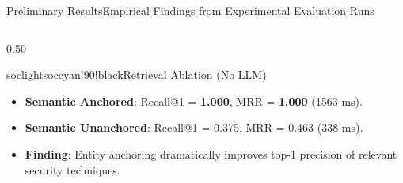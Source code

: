 \documentclass[aspectratio=169, 10pt]{beamer}
\begin{document}
\begin{frame}{Preliminary Results}{Empirical Findings from Experimental Evaluation Runs}
\begin{columns}[T]
    \begin{column}{0.50\textwidth}
      \begin{cardbox}{soclight}{soccyan!90!black}{Retrieval Ablation (No LLM)}
        \begin{itemize}\setlength{\itemsep}{1pt}
          \item \textbf{Semantic Anchored}: Recall@1 = \textbf{1.000}, MRR = \textbf{1.000} (1563 ms).
          \item \textbf{Semantic Unanchored}: Recall@1 = 0.375, MRR = 0.463 (338 ms).
          \item \textbf{Finding}: Entity anchoring dramatically improves top-1 precision of relevant security techniques.
        \end{itemize}
      \end{cardbox}
    \end{column}
  \end{columns}
\end{frame}
\end{document}
